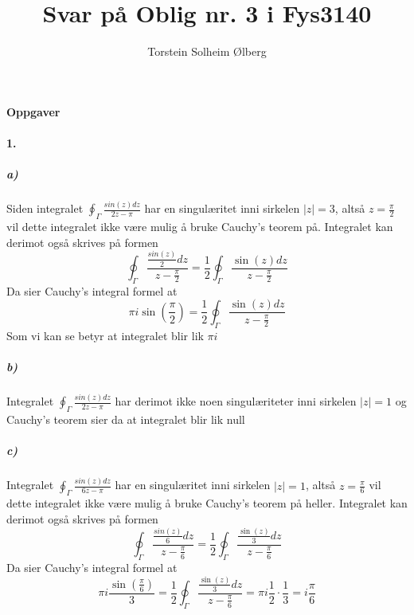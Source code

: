 \documentclass[11pt, A4paper,norsk]{article}
\author{Torstein Solheim Ølberg}
\title{Svar på Oblig nr. 3 i Fys3140}
\begin{document}
\maketitle
	\begin{center}
\Large \textbf{Oppgaver}
	\end{center}









		\paragraph{1.}
			\subparagraph{a)}
				\begin{flushleft}
Siden integralet $\oint_{\Gamma} \frac{sin(z)dz}{2z - \pi}$ har en singulæritet inni sirkelen $|z| = 3$, altså $z = \frac{\pi}{2}$ vil dette integralet ikke være mulig å bruke Cauchy's teorem på. Integralet kan derimot også skrives på formen 
$$\oint_{\Gamma} \frac{\frac{sin(z)}{2}dz}{z - \frac{\pi}{2}} = \frac{1}{2} \oint_{\Gamma} \frac{\sin(z)dz}{z - \frac{\pi}{2}}$$
Da sier Cauchy's integral formel at
$$\pi i \sin\left(\frac{\pi}{2}\right) =  \frac{1}{2} \oint_{\Gamma} \frac{\sin(z)dz}{z - \frac{\pi}{2}}$$
Som vi kan se betyr at integralet blir lik $\pi i$
				\end{flushleft}









			\subparagraph{b)}
				\begin{flushleft}
Integralet $\oint_{\Gamma} \frac{sin(z)dz}{2z - \pi}$ har derimot ikke noen singulæriteter inni sirkelen $|z| = 1$ og Cauchy's teorem sier da at integralet blir lik null
				\end{flushleft}









			\subparagraph{c)}
				\begin{flushleft}
Integralet $\oint_{\Gamma} \frac{sin(z)dz}{6z - \pi}$ har en singulæritet inni sirkelen $|z| = 1$, altså $z = \frac{\pi}{6}$ vil dette integralet ikke være mulig å bruke Cauchy's teorem på heller. Integralet kan derimot også skrives på formen
$$\oint_{\Gamma} \frac{\frac{sin(z)}{6}dz}{z - \frac{\pi}{6}} = \frac{1}{2} \oint_{\Gamma} \frac{\frac{\sin(z)}{3}dz}{z - \frac{\pi}{6}}$$
Da sier Cauchy's integral formel at
$$\pi i \frac{\sin\left(\frac{\pi}{6}\right)}{3} =  \frac{1}{2} \oint_{\Gamma} \frac{\frac{\sin(z)}{3}dz}{z - \frac{\pi}{6}} = \pi i \frac{1}{2} \cdot \frac{1}{3} = i \frac{\pi}{6}$$
				\end{flushleft}
			
\end{document}
